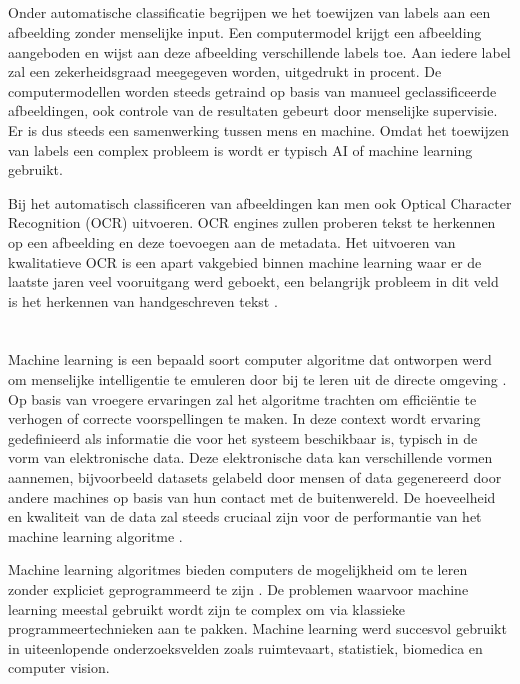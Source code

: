 \subsection{}
\label{sec:automatic-classification}
Onder automatische classificatie begrijpen we het toewijzen van labels aan een afbeelding zonder menselijke input. Een computermodel krijgt een afbeelding aangeboden en wijst aan deze afbeelding verschillende labels toe. Aan iedere label zal een zekerheidsgraad meegegeven worden, uitgedrukt in procent. De computermodellen worden steeds getraind op basis van manueel geclassificeerde afbeeldingen, ook controle van de resultaten gebeurt door menselijke supervisie. Er is dus steeds een samenwerking tussen mens en machine. Omdat het toewijzen van labels een complex probleem is wordt er typisch AI of machine learning gebruikt.

Bij het automatisch classificeren van afbeeldingen kan men ook Optical Character Recognition (OCR) uitvoeren. OCR engines zullen proberen tekst te herkennen op een afbeelding en deze toevoegen aan de metadata. Het uitvoeren van kwalitatieve OCR is een apart vakgebied binnen machine learning waar er de laatste jaren veel vooruitgang werd geboekt, een belangrijk probleem in dit veld is het herkennen van handgeschreven tekst \autocite{Breuel2013}.

\section{}
\label{sec:machine-learning}
Machine learning is een bepaald soort computer algoritme dat ontworpen werd om menselijke intelligentie te emuleren door bij te leren uit de directe omgeving \autocite{ElNaqa2015}. Op basis van vroegere ervaringen zal het algoritme trachten om efficiëntie te verhogen of correcte voorspellingen te maken. In deze context wordt ervaring gedefinieerd als informatie die voor het systeem beschikbaar is, typisch in de vorm van elektronische data. Deze elektronische data kan verschillende vormen aannemen, bijvoorbeeld datasets gelabeld door mensen of data gegenereerd door andere machines op basis van hun contact met de buitenwereld. De hoeveelheid en kwaliteit van de data zal steeds cruciaal zijn voor de performantie van het machine learning algoritme \autocite{Mohri2018}.

Machine learning algoritmes bieden computers de mogelijkheid om te leren zonder expliciet geprogrammeerd te zijn \autocite{DeVreese2017}. De problemen waarvoor machine learning meestal gebruikt wordt zijn te complex om via klassieke programmeertechnieken aan te pakken. Machine learning werd succesvol gebruikt in uiteenlopende onderzoeksvelden zoals ruimtevaart, statistiek, biomedica en computer vision.

